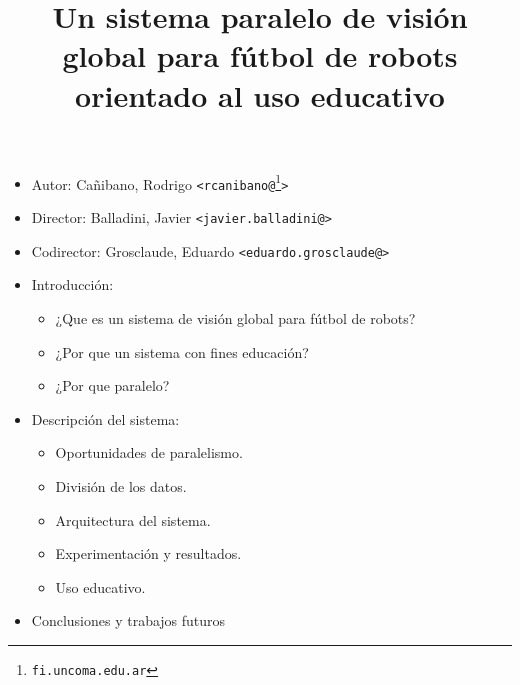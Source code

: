 \documentclass[11pt,a4paper,spanish]{beamer}
\title{Un sistema paralelo de visión global para fútbol de robots
	orientado al uso educativo}
\author{}
\date{}
\begin{document}
\begin{frame}

	\maketitle

\begin{itemize}

	\item Autor: Cañibano, Rodrigo \texttt{<rcanibano@\footnote[1]{fi.uncoma.edu.ar}>}

	\item Director: Balladini, Javier \texttt{<javier.balladini@\footnotemark[1]>}

	\item Codirector: Grosclaude, Eduardo \texttt{<eduardo.grosclaude@\footnotemark[1]>}

\end{itemize}

\end{frame}

\begin{frame}

\begin{itemize}

\item Introducción:

\begin{itemize}

	\item ¿Que es un sistema de visión global para fútbol de robots?

	\item ¿Por que un sistema con fines educación?

	\item ¿Por que paralelo?

\end{itemize}

\item Descripción del sistema:

\begin{itemize}

	\item Oportunidades de paralelismo.

	\item División de los datos.

	\item Arquitectura del sistema.

	\item Experimentación y resultados.

	\item Uso educativo.

\end{itemize}

\item Conclusiones y trabajos futuros

\end{itemize}

\end{frame}
\end{document}
